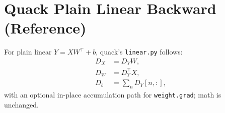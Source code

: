 \documentclass[11pt]{article}
\begin{document}
\section{Quack Plain Linear Backward (Reference)}
For plain linear $Y=XW^\top+b$, quack's \texttt{linear.py} follows:
\begin{align}
D_X &= D_Y W, \\
D_W &= D_Y^\top X, \\
D_b &= \sum_n D_Y[n,:],
\end{align}
with an optional in-place accumulation path for \texttt{weight.grad}; math is unchanged.
\end{document}
